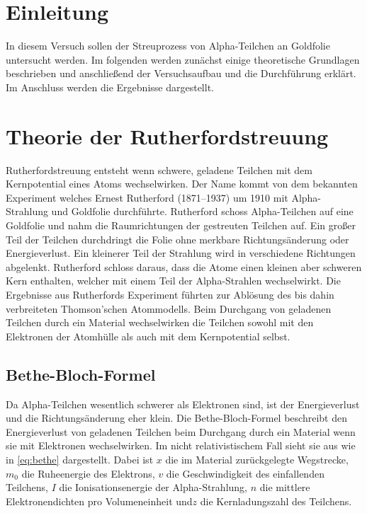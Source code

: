 \section{Einleitung}
\label{sec:einleitung}
In diesem Versuch sollen der Streuprozess von Alpha-Teilchen an Goldfolie untersucht werden. Im folgenden werden zunächst einige theoretische
Grundlagen beschrieben und anschließend der Versuchsaufbau und die Durchführung erklärt. Im Anschluss werden die Ergebnisse dargestellt.



\section{Theorie der Rutherfordstreuung}
\label{sec:theorie}

Rutherfordstreuung entsteht wenn schwere, geladene Teilchen mit dem Kernpotential eines Atoms wechselwirken.
Der Name kommt von dem bekannten Experiment welches Ernest Rutherford (1871–1937)  um
1910 mit Alpha-Strahlung und Goldfolie durchführte. Rutherford schoss Alpha-Teilchen auf eine Goldfolie
und nahm die Raumrichtungen der gestreuten Teilchen auf. Ein großer Teil der Teilchen durchdringt
die Folie ohne merkbare Richtungsänderung oder Energieverlust. Ein kleinerer Teil der Strahlung wird
in verschiedene Richtungen abgelenkt.
Rutherford schloss daraus, dass die Atome einen kleinen aber schweren Kern enthalten,
welcher mit einem Teil der Alpha-Strahlen wechselwirkt.
Die Ergebnisse aus Rutherfords Experiment führten zur Ablösung des bis dahin verbreiteten Thomson'schen Atommodells.
Beim Durchgang von geladenen Teilchen durch ein Material wechselwirken die Teilchen sowohl mit den
Elektronen der Atomhülle als auch mit dem Kernpotential selbst.

\subsection{Bethe-Bloch-Formel}
\label{sub:bethe}

Da Alpha-Teilchen wesentlich schwerer als Elektronen sind,
ist der Energieverlust und die Richtungsänderung eher klein.
Die Bethe-Bloch-Formel beschreibt den Energieverlust von geladenen Teilchen beim Durchgang durch ein
Material wenn sie mit Elektronen wechselwirken.
Im nicht relativistischem Fall sieht sie aus wie in \eqref{eq:bethe} dargestellt.
Dabei ist $x$ die im Material zurückgelegte Wegstrecke, $m_0$ die Ruheenergie des Elektrons,
$v$ die Geschwindigkeit des einfallenden Teilchens, $I$ die Ionisationsenergie der Alpha-Strahlung,
$n$ die mittlere Elektronendichten pro Volumeneinheit und$z$ die Kernladungszahl des Teilchens.

